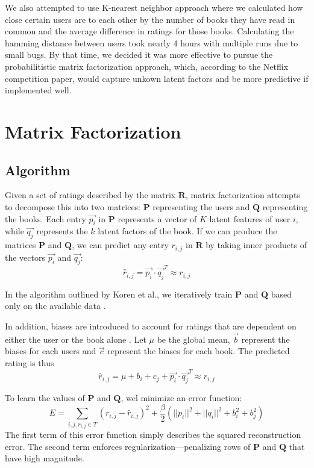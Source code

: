 \documentclass[11pt]{amsart}
\newcommand{\mat}[1]{\mathbf{#1}}
\begin{document}
We also attempted to use K-nearest neighbor approach where we calculated how close certain users are to each other by the number of books they have read in common and the average difference in ratings for those books. Calculating the hamming distance between users took nearly 4 hours with multiple runs due to small bugs. By that time, we decided it was more effective to pursue the probabilitistic matrix factorization approach, which, according to the Netflix competition paper, would capture unkown latent factors and be more predictive if implemented well. 

\section{Matrix Factorization}
\subsection{Algorithm}

Given a set of ratings described by the matrix $\mat{R}$, matrix factorization attempts to decompose this into two matrices: $\mat{P}$ representing the users and $\mat{Q}$ representing the books. Each entry $\vec{p_i}$ in $\mat{P}$ represents a vector of $K$ latent features of user $i$, while $\vec{q_j}$ represents the $k$ latent factors of the book. If we can produce the matrices $\mat{P}$ and $\mat{Q}$, we can predict any entry $r_{i,j}$ in $\mat{R}$ by taking inner products of the vectors $\vec{p_i}$ and $\vec{q_j}$:
$$\hat{r}_{i,j} = \vec{p_i} \cdot \vec{q_j}^T \approx r_{i,j}$$

In the algorithm outlined by Koren et al., we iteratively train $\mat{P}$ and $\mat{Q}$ based only on the available data \cite{Koren:2009uc}.

In addition, biases are introduced to account for ratings that are dependent on either the user or the book alone \cite{Paterek:2007va,Koren:2009uc}.  Let $\mu$ be the global mean, $\vec{b}$ represent the biases for each users and $\vec{c}$ represent the biases for each book. The predicted rating is thus 
$$\hat{r}_{i,j} = \mu + b_i + c_j + \vec{p_i} \cdot \vec{q_j}^T \approx r_{i,j}$$

To learn the values of $\mat{P}$ and $\mat{Q}$, wel minimize an error function:
$$E = \sum_{i,j,r_{i,j} \in T} \left(r_{i,j} - \hat{r}_{i,j}\right)^2 + \frac{\beta}{2} \left( ||p_i||^2 + ||q_i||^2 + b_i^2 + b_j^2 \right) $$
The first term of this error function simply describes the squared reconstruction error. The second term enforces regularization---penalizing rows of $\mat{P}$ and $\mat{Q}$ that have high magnitude. 
\end{document}
